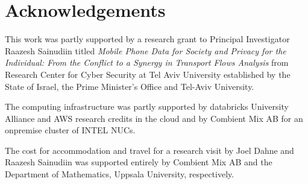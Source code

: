 \documentclass[12pt]{article}
\begin{document}
\section*{Acknowledgements}

This work was partly supported by a research grant to Principal Investigator Raazesh Sainudiin titled 
{\em Mobile Phone Data for Society and Privacy for the Individual: From the Conflict to a Synergy in Transport Flows Analysis} 
from Research Center for Cyber Security at Tel Aviv University established by the State of Israel, 
the Prime Minister’s Office and Tel-Aviv University. 

The computing infrastructure was partly supported by databricks University Alliance and AWS research credits in the cloud and by Combient Mix AB for an onpremise cluster of INTEL NUCs.

The cost for accommodation and travel for a research visit by Joel Dahne and Raazesh Sainudiin was supported entirely by Combient Mix AB and the Department of Mathematics, Uppsala University, respectively.
\end{document}
